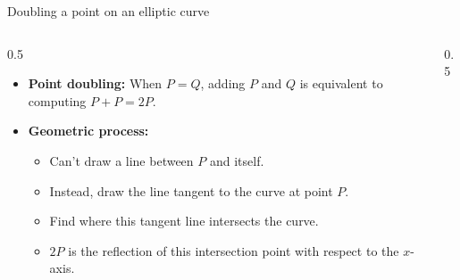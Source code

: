 \ifdefined\PRESENTATION\else\PassOptionsToClass{handout}{beamer}\fi\documentclass[aspectratio=169, lualatex]{beamer}
\begin{document}
\begin{frame}{Doubling a point on an elliptic curve}
	\begin{columns}
		\begin{column}{0.5\textwidth}
			\begin{itemize}
				\item \textbf{Point doubling:} When $P = Q$, adding $P$ and $Q$ is equivalent to computing $P + P = 2P$.
				\item \textbf{Geometric process:}
				      \begin{itemize}
					      \item Can't draw a line between $P$ and itself.
					      \item Instead, draw the line tangent to the curve at point $P$.
					      \item Find where this tangent line intersects the curve.
					      \item $2P$ is the reflection of this intersection point with respect to the $x$-axis.
				      \end{itemize}
			\end{itemize}
		\end{column}
		\begin{column}{0.5\textwidth}
		\end{column}
	\end{columns}
\end{frame}
\end{document}

